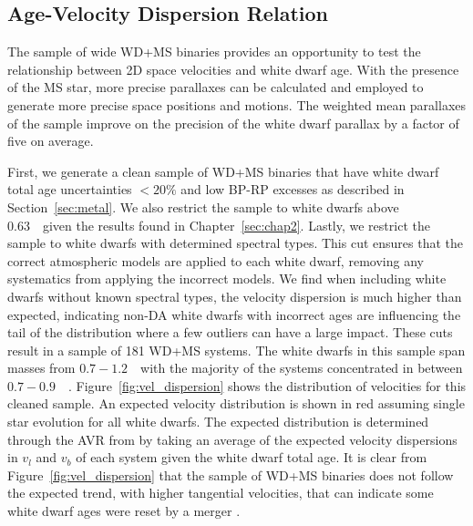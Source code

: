 \subsection{Age-Velocity Dispersion Relation}\label{sec:AVR}

The sample of wide WD+MS binaries provides an opportunity to test the relationship between 2D space velocities and white dwarf age. With the presence of the MS star, more precise parallaxes can be calculated and employed to generate more precise space positions and motions. The weighted mean parallaxes of the sample improve on the precision of the white dwarf parallax by a factor of five on average. 

First, we generate a clean sample of WD+MS binaries that have white dwarf total age uncertainties $<20\%$ and low BP-RP excesses as described in Section~\ref{sec:metal}. We also restrict the sample to white dwarfs above 0.63~\msun\ given the results found in Chapter~\ref{sec:chap2}. Lastly, we restrict the sample to white dwarfs with determined spectral types. This cut ensures that the correct atmospheric models are applied to each white dwarf, removing any systematics from applying the incorrect models. We find when including white dwarfs without known spectral types, the velocity dispersion is much higher than expected, indicating non-DA white dwarfs with incorrect ages are influencing the tail of the distribution where a few outliers can have a large impact. These cuts result in a sample of 181 WD+MS systems. The white dwarfs in this sample span masses from $0.7-1.2$~\msun\ with the majority of the systems concentrated in between $0.7-0.9$~\msun\ . Figure~\ref{fig:vel_dispersion} shows the distribution of velocities for this cleaned sample. An expected velocity distribution is shown in red assuming single star evolution for all white dwarfs. The expected distribution is determined through the AVR from \cite{2019ApJ...886..100C} by taking an average of the expected velocity dispersions in $v_l$ and $v_b$ of each system given the white dwarf total age. It is clear from Figure~\ref{fig:vel_dispersion} that the sample of WD+MS binaries does not follow the expected trend, with higher tangential velocities, that can indicate some white dwarf ages were reset by a merger \citep{2020ApJ...891..160C}.


